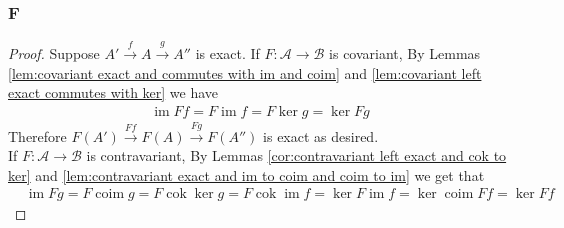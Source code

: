 \documentclass{article}
\newcommand{\fA}{\mathscr{A}}
\newcommand{\fB}{\mathscr{B}}
\DeclareMathOperator{\im}{\mathrm{im}}
\DeclareMathOperator{\coim}{\mathrm{coim}}
\DeclareMathOperator{\cok}{\mathrm{cok}}
\begin{document}
\subsubsection{F}\label{1.6.F}
\begin{proof}
    Suppose $A' \xrightarrow{f} A\xrightarrow{g}A''$ is exact. If $F:\fA\to \fB$ is covariant, By Lemmas \ref{lem:covariant exact and commutes with im and coim} and \ref{lem:covariant left exact commutes with ker} we have
    \begin{align*}
        \im Ff=F\im f=F\ker g=\ker Fg
    \end{align*}
    Therefore $F(A')\xrightarrow{Ff} F(A) \xrightarrow{Fg}F(A'')$ is exact as desired. \\
    If $F:\fA\to \fB$ is contravariant, By Lemmas \ref{cor:contravariant left exact and cok to ker} and \ref{lem:contravariant exact and im to coim and coim to im} we get that 
    \begin{align*}
        &\im Fg=F\coim g=F\cok \ker g=F\cok \im f=\ker F\im f=\ker \coim Ff=\ker Ff
    \end{align*}
   
\end{proof}
\end{document}
